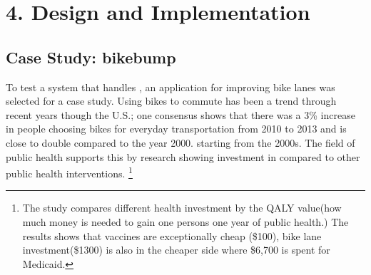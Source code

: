 \chapter{4. Design and Implementation}

\section{Case Study: bikebump}
To test a system that handles , an application for improving bike lanes was selected for a case study. Using bikes to commute has been a trend through recent years though the U.S.;  one consensus shows that there was a 3\% increase in people choosing bikes for everyday transportation from 2010 to 2013 and is close to double compared to the year 2000.\cite{debra2016onemillion}   starting from the 2000s.\cite{sadik2017streetfight} The field of public health supports this by research showing investment in  compared to other public health interventions\cite{gu2016cost}.
\footnote{The study compares different health investment by the QALY value(how much money is needed to gain one persons one year of public health.) The results shows that vaccines are exceptionally cheap (\$100), bike lane investment(\$1300) is also in the cheaper side where \$6,700 is spent for Medicaid.}

